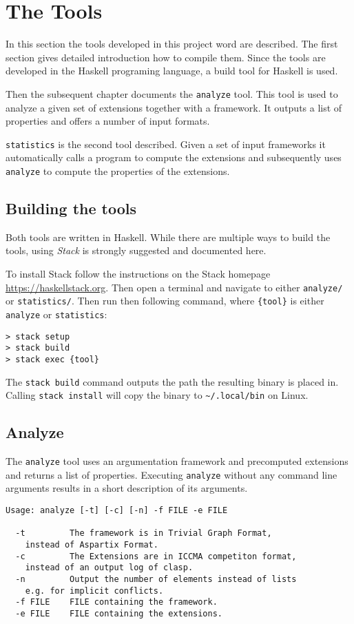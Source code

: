 \documentclass[parskip=half]{scrartcl}
\begin{document}
\section{The Tools}
\label{tools}
In this section the tools developed in this project word are described. The
first section gives detailed introduction how to compile them. Since the tools
are developed in the Haskell programing language, a build tool for Haskell is
used.

Then the subsequent chapter documents the \texttt{analyze} tool. This tool is
used to analyze a given set of extensions together with a framework. It outputs
a list of properties and offers a number of input formats.

\texttt{statistics} is the second tool described. Given a set of input
frameworks it automatically calls a program to compute the extensions and
subsequently uses \texttt{analyze} to compute the properties of the extensions.

\subsection{Building the tools}
Both tools are written in Haskell. While there are multiple ways to build the
tools, using \emph{Stack} is strongly suggested and documented here.

To install Stack follow the instructions on the Stack homepage
\url{https://haskellstack.org}. Then open a terminal and navigate to either
\texttt{analyze/} or \texttt{statistics/}. Then run then following command,
where \texttt{\{tool\}} is either \texttt{analyze} or \texttt{statistics}:
\begin{verbatim}
> stack setup
> stack build
> stack exec {tool}
\end{verbatim}

The \texttt{stack build} command outputs the path the resulting binary
is placed in. Calling \texttt{stack install} will copy the binary
to \texttt{\~{}/.local/bin} on Linux.

\subsection{Analyze}

The \texttt{analyze} tool uses an argumentation framework and precomputed
extensions and returns a list of properties. Executing \texttt{analyze}
without any command line arguments results in a short description of
its arguments.

\begin{verbatim}
Usage: analyze [-t] [-c] [-n] -f FILE -e FILE

  -t         The framework is in Trivial Graph Format,
    instead of Aspartix Format.
  -c         The Extensions are in ICCMA competiton format,
    instead of an output log of clasp.
  -n         Output the number of elements instead of lists
    e.g. for implicit conflicts.
  -f FILE    FILE containing the framework.
  -e FILE    FILE containing the extensions.
\end{verbatim}
\end{document}
